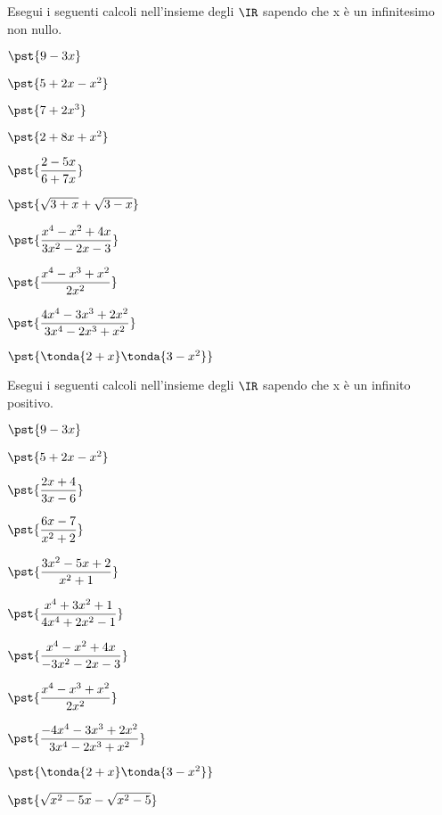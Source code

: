 \begin{esercizio}\label{ese:iper_op_01}
Esegui i seguenti calcoli nell'insieme degli \(\IR\) sapendo che 
x è un infinitesimo non nullo.
\begin{multicols}{2}
\begin{enumeratea}
 \item \(\pst{9 -3x}\)
 \item \(\pst{5 +2x -x^2}\)
 \item \(\pst{7 +2x^3}\) 
 \item \(\pst{2+8x+x^2}\) 
 \item \(\pst{\dfrac{2-5x}{6 +7x}}\)
 \item \(\pst{\sqrt{3 +x} + \sqrt{3 -x}}\) 
 \item \(\pst{\dfrac{x^4 - x^2 + 4x}{3x^2 -2x -3}}\) 
 \item \(\pst{\dfrac{x^4 - x^3 + x^2}{2x^2}}\) 
 \item \(\pst{\dfrac{4x^4 - 3x^3 + 2x^2}{3x^4 -2x^3 +x^2}} \) 
 \item \(\pst{\tonda{2+x}\tonda{3-x^2}} \)  
\end{enumeratea}
\end{multicols}
\end{esercizio}

\begin{esercizio}\label{ese:iper_op_01}
Esegui i seguenti calcoli nell'insieme degli \(\IR\) sapendo che 
x è un infinito positivo.
\begin{multicols}{2}
\begin{enumeratea}
 \item \(\pst{9 -3x}\)
 \item \(\pst{5 +2x -x^2}\)
 \item \(\pst{\dfrac{2x +4}{3x-6}}\)
 \item \(\pst{\dfrac{6 x-7}{x^2 +2}}\)
 \item \(\pst{\dfrac{3x^2 -5x +2}{x^2 +1}}\)
 \item \(\pst{\dfrac{x^4 +3x^2 +1}{4x^4 +2x^2 -1}}\)
 \item \(\pst{\dfrac{x^4 - x^2 + 4x}{-3x^2 -2x -3}}\) 
 \item \(\pst{\dfrac{x^4 - x^3 + x^2}{2x^2}}\) 
 \item \(\pst{\dfrac{-4x^4 - 3x^3 + 2x^2}{3x^4 -2x^3 +x^2}} \) 
 \item \(\pst{\tonda{2+x}\tonda{3-x^2}} \)  
 \item \(\pst{\sqrt{x^2-5x} - \sqrt{x^2-5}}\) 
\end{enumeratea}
\end{multicols}
\end{esercizio}

